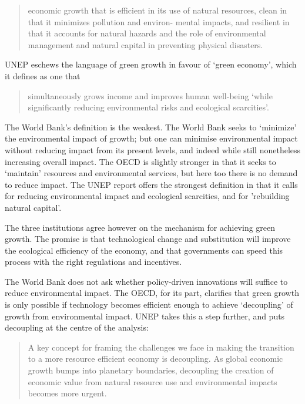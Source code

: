 \documentclass[
]{book}
\begin{document}
\begin{quote}
economic growth that is efficient in its use of natural resources, clean in that it minimizes pollution and environ-
mental impacts, and resilient in that it accounts for natural hazards and the role of environmental management and natural capital in preventing physical disasters.
\end{quote}

UNEP eschews the language of green growth in favour of `green economy', which it defines as one
that

\begin{quote}
simultaneously grows income and improves human well-being `while significantly reducing
environmental risks and ecological scarcities'.
\end{quote}

The World
Bank's definition is the weakest. The World Bank seeks to `minimize' the environmental impact of
growth; but one can minimise environmental impact without reducing impact from its present
levels, and indeed while still nonetheless increasing overall impact. The OECD is slightly stronger
in that it seeks to `maintain' resources and environmental services, but here too there is no
demand to reduce impact. The UNEP report offers the strongest definition in that it calls for reducing
environmental impact and ecological scarcities, and for 'rebuilding natural capital'.

The three institutions agree however on the mechanism for achieving green growth. The promise is
that technological change and substitution will improve the ecological efficiency of the economy, and
that governments can speed this process with the right regulations and incentives.

The World Bank does not ask whether policy-driven innovations will suffice
to reduce environmental impact. The OECD, for its part, clarifies that green growth is only possible if
technology becomes efficient enough to achieve `decoupling' of growth from environmental impact.
UNEP takes this a step further, and puts decoupling at the centre of the analysis:

\begin{quote}
A key concept for framing the challenges we face in making the transition to a more resource efficient economy is
decoupling. As global economic growth bumps into planetary boundaries, decoupling the creation of economic
value from natural resource use and environmental impacts becomes more urgent.
\end{quote}
\end{document}
